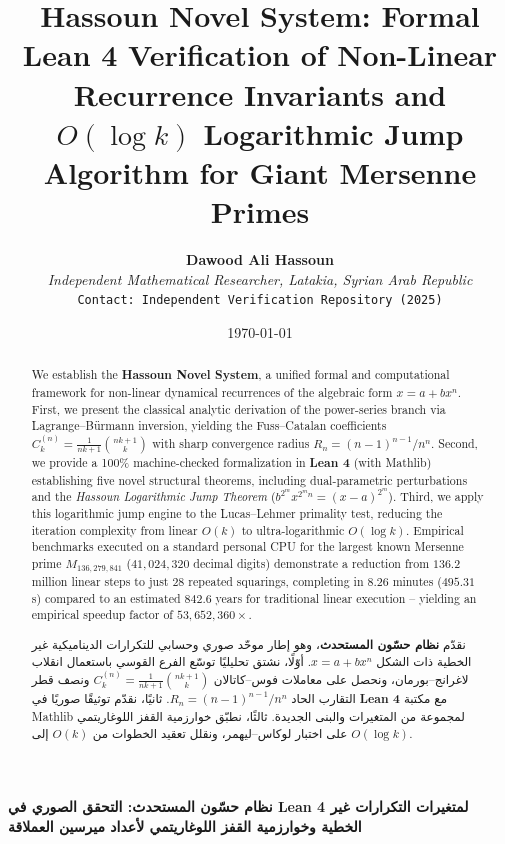 \documentclass[11pt,a4paper]{article}
\title{\textbf{\Large Hassoun Novel System: Formal Lean 4 Verification of Non-Linear Recurrence Invariants and $O(\log k)$ Logarithmic Jump Algorithm for Giant Mersenne Primes}}
\author{\textbf{Dawood Ali Hassoun}\\
\textit{Independent Mathematical Researcher, Latakia, Syrian Arab Republic}\\
\texttt{Contact: Independent Verification Repository (2025)}}
\date{\today}
\theoremstyle{definition}
\begin{document}
\maketitle
\vspace{0.5em}
\begin{Arabic}
\begin{center}
\textbf{\Large نظام حسّون المستحدث: التحقق الصوري في Lean 4 لمتغيرات التكرارات غير الخطية وخوارزمية القفز اللوغاريتمي لأعداد ميرسين العملاقة}
\end{center}
\end{Arabic}

\begin{abstract}
We establish the \textbf{Hassoun Novel System}, a unified formal and computational framework for non-linear dynamical recurrences of the algebraic form $x = a + b x^n$. First, we present the classical analytic derivation of the power-series branch via Lagrange--B\"urmann inversion, yielding the Fuss--Catalan coefficients $C_k^{(n)} = \frac{1}{nk+1}\binom{nk+1}{k}$ with sharp convergence radius $R_n = (n-1)^{n-1}/n^n$. Second, we provide a 100\% machine-checked formalization in \textbf{Lean 4} (with Mathlib) establishing five novel structural theorems, including dual-parametric perturbations and the \emph{Hassoun Logarithmic Jump Theorem} ($b^{2^m} x^{2^m n} = (x-a)^{2^m}$). Third, we apply this logarithmic jump engine to the Lucas--Lehmer primality test, reducing the iteration complexity from linear $O(k)$ to ultra-logarithmic $O(\log k)$. Empirical benchmarks executed on a standard personal CPU for the largest known Mersenne prime $M_{136,279,841}$ ($41,024,320$ decimal digits) demonstrate a reduction from $136.2$ million linear steps to just $28$ repeated squarings, completing in $8.26$ minutes ($495.31$ s) compared to an estimated $842.6$ years for traditional linear execution -- yielding an empirical speedup factor of \textbf{$53,652,360\times$}.
\end{abstract}
\begin{Arabic}
\begin{abstract}
نقدّم \textbf{نظام حسّون المستحدث}، وهو إطار موحّد صوري وحسابي للتكرارات الديناميكية غير الخطية ذات الشكل $x = a + b x^n$. أوّلًا، نشتق تحليليًا توسّع الفرع القوسي باستعمال انقلاب لاغرانج--بورمان، ونحصل على معاملات فوس--كاتالان
$C_k^{(n)} = \frac{1}{nk+1}\binom{nk+1}{k}$ ونصف قطر التقارب الحاد $R_n = (n-1)^{n-1}/n^n$. ثانيًا، نقدّم توثيقًا صوريًا في \textbf{Lean 4} مع مكتبة Mathlib لمجموعة من المتغيرات والبنى الجديدة. ثالثًا، نطبّق خوارزمية القفز اللوغاريتمي على اختبار لوكاس--ليهمر، ونقلل تعقيد الخطوات من $O(k)$ إلى $O(\log k)$.
\end{abstract}
\end{Arabic}
\end{document}
